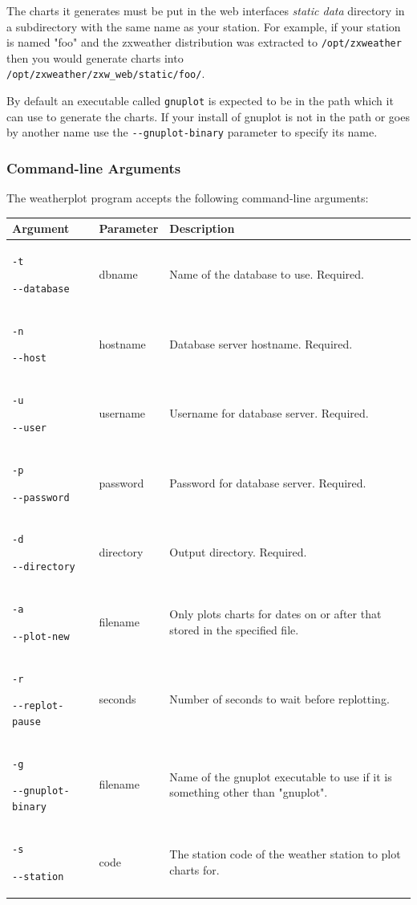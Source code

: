 \documentclass[a4paper,10pt,draft]{book}
\begin{document}
The charts it generates must be put in the web interfaces \emph{static data} directory in a subdirectory with the same name as your station. For example, if your station is named "foo" and the zxweather distribution was extracted to \verb|/opt/zxweather| then you would generate charts into \\ \verb|/opt/zxweather/zxw_web/static/foo/|.

By default an executable called \verb|gnuplot| is expected to be in the path which it can use to generate the charts. If your install of gnuplot is not in the path or goes by another name use the \verb|--gnuplot-binary| parameter to specify its name.

\subsubsection{Command-line Arguments}
The weatherplot program accepts the following command-line arguments:

\begin{tabular}{p{3.4cm} l p{8cm}}
\hline
\textbf{Argument} & \textbf{Parameter} & \textbf{Description} \\
\hline
\verb|-t| \par \verb|--database| & dbname & Name of the database to use. Required. \\
\verb|-n| \par \verb|--host| & hostname & Database server hostname. Required. \\
\verb|-u| \par \verb|--user| & username & Username for database server. Required. \\
\verb|-p| \par \verb|--password| & password & Password for database server. Required. \\
\verb|-d| \par \verb|--directory| & directory & Output directory. Required. \\
\verb|-a| \par \verb|--plot-new| & filename & Only plots charts for dates on or after that stored in the specified file. \\
\verb|-r| \par \verb|--replot-pause| & seconds & Number of seconds to wait before replotting.\\
\verb|-g| \par \verb|--gnuplot-binary| & filename & Name of the gnuplot executable to use if it is something other than "gnuplot".\\
\verb|-s| \par \verb|--station| & code & The station code of the weather station to plot charts for.\\
\hline
\end{tabular}
\end{document}
